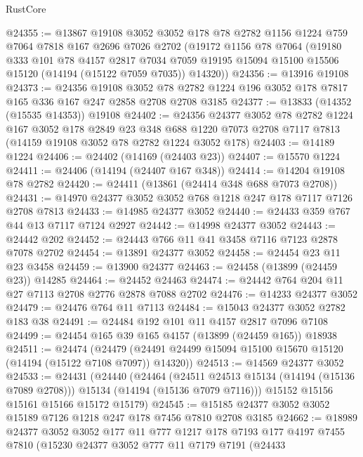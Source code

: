 \begin{lexlean}{RustCore}
\begin{coremodule}
@24355 := @13867
    @19108
    @3052
    @3052
    @178
    @78
    @2782
    @1156
    @1224
    @759
    @7064
    @7818
    @167
    @2696
    @7026
    @2702
    (@19172
      @1156
      @78
      @7064
      (@19180
        @333
        @101
        @78
        @4157
        @2817
        @7034
        @7059
        @19195
        @15094
        @15100
        @15506
        @15120
        (@14194 (@15122 @7059 @7035))
        @14320))
@24356 := @13916 @19108
@24373 := @24356
    @19108
    @3052
    @78
    @2782
    @1224
    @196
    @3052
    @178
    @7817
    @165
    @336
    @167
    @247
    @2858
    @2708
    @2708
    @3185
@24377 := @13833 (@14352 (@15535 @14353)) @19108
@24402 := @24356
    @24377
    @3052
    @78
    @2782
    @1224
    @167
    @3052
    @178
    @2849
    @23
    @348
    @688
    @1220
    @7073
    @2708
    @7117
    @7813
    (@14159 @19108 @3052 @78 @2782 @1224 @3052 @178)
@24403 := @14189 @1224
@24406 := @24402 (@14169 (@24403 @23))
@24407 := @15570 @1224
@24411 := @24406 (@14194 (@24407 @167 @348))
@24414 := @14204 @19108 @78 @2782
@24420 := @24411 (@13861 (@24414 @348 @688 @7073 @2708))
@24431 := @14970 @24377 @3052 @3052 @768 @1218 @247 @178 @7117 @7126 @2708 @7813
@24433 := @14985 @24377 @3052
@24440 := @24433 @359 @767 @44 @13 @7117 @7124 @2927
@24442 := @14998 @24377 @3052
@24443 := @24442 @202
@24452 := @24443 @766 @11 @41 @3458 @7116 @7123 @2878 @7078 @2702
@24454 := @13891 @24377 @3052
@24458 := @24454 @23 @11 @23 @3458
@24459 := @13900 @24377
@24463 := @24458 (@13899 (@24459 @23)) @14285
@24464 := @24452 @24463
@24474 := @24442 @764 @204 @11 @27 @7113 @2708 @2776 @2878 @7088 @2702
@24476 := @14233 @24377 @3052
@24479 := @24476 @764 @11 @7113
@24484 := @15043 @24377 @3052 @2782 @183 @38
@24491 := @24484 @192 @101 @11 @4157 @2817 @7096 @7108
@24499 := @24454 @165 @39 @165 @4157 (@13899 (@24459 @165)) @18938
@24511 := @24474
    (@24479 (@24491 @24499 @15094 @15100 @15670 @15120 (@14194 (@15122 @7108 @7097)) @14320))
@24513 := @14569 @24377 @3052
@24533 := @24431
    (@24440
      (@24464
        (@24511 @24513 @15134 (@14194 (@15136 @7089 @2708)))
        @15134
        (@14194 (@15136 @7079 @7116)))
      @15152
      @15156
      @15161
      @15166
      @15172
      @15179)
@24545 := @15185 @24377 @3052 @3052 @15189 @7126 @1218 @247 @178 @7456 @7810 @2708 @3185
@24662 := @18989
    @24377
    @3052
    @3052
    @177
    @11
    @777
    @1217
    @178
    @7193
    @177
    @4197
    @7455
    @7810
    (@15230
      @24377
      @3052
      @777
      @11
      @7179
      @7191
      (@24433

\end{coremodule}
\end{lexlean}
